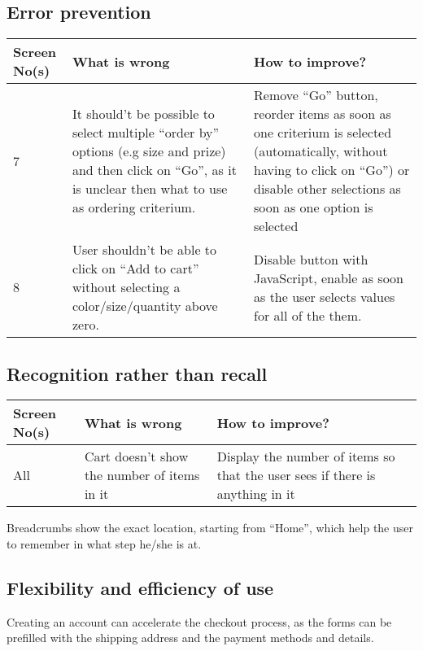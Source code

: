 \documentclass[fontsize=12pt,paper=a4]{scrartcl}
\begin{document}
\subsection{Error prevention}
\begin{table}[htdp]
\begin{center}
\begin{tabular}{|p{2cm}|p{6.5cm}|p{6.5cm}|}
\hline
\textbf{Screen No(s)} & \textbf{What is wrong} & \textbf{How to improve?} \\
\hline
7 & It should't be possible to select multiple ``order by'' options (e.g size and prize) and then click on ``Go'', as it is unclear then what to use as ordering criterium. & Remove ``Go'' button, reorder items as soon as one criterium is selected (automatically, without having to click on ``Go'') or disable other selections as soon as one option is selected\\ 
\hline
8 & User shouldn't be able to click on ``Add to cart'' without selecting a color/size/quantity above zero. & Disable button with JavaScript, enable as soon as the user selects values for all of the them.\\
\hline
\end{tabular}
\end{center}
\label{5_heurisitcs_eval}
\end{table}


\subsection{Recognition rather than recall}
\begin{table}[htdp]
\begin{center}
\begin{tabular}{|p{2cm}|p{6.5cm}|p{6.5cm}|}
\hline
\textbf{Screen No(s)} & \textbf{What is wrong} & \textbf{How to improve?} \\
\hline
All & Cart doesn't show the number of items in it & Display the number of items so that the user sees if there is anything in it\\
\hline
\end{tabular}
\end{center}
\label{6_heurisitcs_eval}
\end{table}
Breadcrumbs show the exact location, starting from ``Home'', which help the user to remember in what step he/she is at.

\subsection{Flexibility and efficiency of use}
Creating an account can accelerate the checkout process, as the forms can be prefilled with the shipping address and the payment methods and details.
\end{document}
